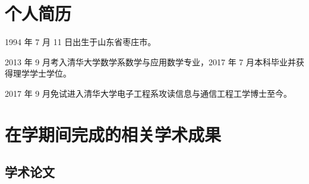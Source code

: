 
\begin{resume}

  \section*{个人简历}

  1994 年 7 月 11 日出生于山东省枣庄市。

  2013 年 9 月考入清华大学数学系数学与应用数学专业，2017 年 7 月本科毕业并获得理学学士学位。

  2017 年 9 月免试进入清华大学电子工程系攻读信息与通信工程工学博士至今。


  \section*{在学期间完成的相关学术成果}

  \subsection*{学术论文}
  

\end{resume}
